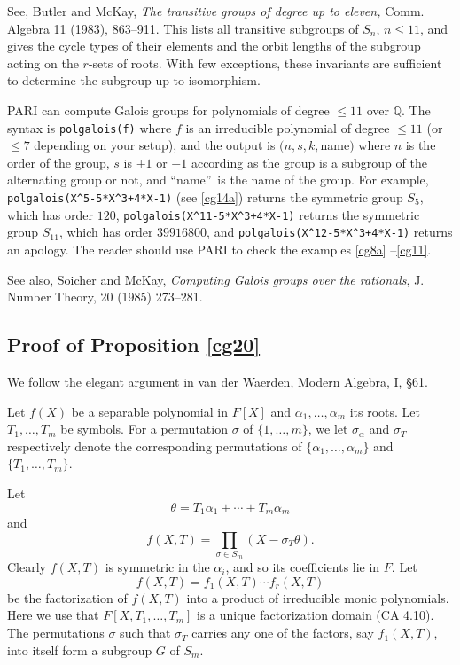 \documentclass[a4paper,11pt,final,openany]{memoir}
\theoremstyle{nonumberplain}
\begin{document}
See, Butler and McKay, \textit{The transitive groups of degree up to
eleven}\emph{,\/} Comm. Algebra 11 (1983), 863--911. This lists all transitive
subgroups of $S_{n}$, $n\leq11$, and gives the cycle types of their elements
and the orbit lengths of the subgroup acting on the $r$-sets of roots. With
few exceptions, these invariants are sufficient to determine the subgroup up
to isomorphism.

PARI%
can compute Galois groups for polynomials of degree $\leq11$ over $\mathbb{Q}%
$. The syntax is \verb|polgalois(f)| where $f$ is an irreducible polynomial of
degree $\leq11$ (or $\leq7$ depending on your setup), and the output is
$(n,s,k,$name$)$ where $n$ is the order of the group, $s$ is $+1$ or $-1$
according as the group is a subgroup of the alternating group or not, and
\textquotedblleft name\textquotedblright\ is the name of the group. For
example, \verb|polgalois(X^5-5*X^3+4*X-1)| (see \ref{cg14a}) returns the
symmetric group $S_{5}$, which has order $120$,
\verb|polgalois(X^11-5*X^3+4*X-1)| returns the symmetric group $S_{11}$, which
has order $39916800$, and \newline\verb|polgalois(X^12-5*X^3+4*X-1)| returns
an apology. The reader should use PARI to check the examples \ref{cg8a}%
--\ref{cg11}.

See also, Soicher and McKay, \textit{Computing Galois groups over the
rationals}, J. Number Theory, 20 (1985) 273--281.

\subsection{Proof of Proposition \ref{cg20}}

We follow the elegant argument in van der Waerden, Modern Algebra, I, \S 61.

Let $f(X)$ be a separable polynomial in $F[X]$ and $\alpha_{1},\ldots
,\alpha_{m}$ its roots. Let $T_{1},\ldots,T_{m}$ be symbols. For a permutation
$\sigma$ of $\{1,\ldots,m\}$, we let $\sigma_{\alpha}$ and $\sigma_{T}$
respectively denote the corresponding permutations of $\{\alpha_{1}%
,\ldots,\alpha_{m}\}$ and $\{T_{1},\ldots,T_{m}\}$.

Let%
\[
\theta=T_{1}\alpha_{1}+\cdots+T_{m}\alpha_{m}%
\]
and%
\[
f(X,T)=\prod_{\sigma\in S_{m}}(X-\sigma_{T}\theta).
\]
Clearly $f(X,T)$ is symmetric in the $\alpha_{i}$, and so its coefficients lie
in $F$. Let%
\begin{equation}
f(X,T)=f_{1}(X,T)\cdots f_{r}(X,T) \label{eq13}%
\end{equation}
be the factorization of $f(X,T)$ into a product of irreducible monic
polynomials. Here we use that $F[X,T_{1},\ldots,T_{m}]$ is a unique
factorization domain (CA 4.10). The permutations $\sigma$ such that
$\sigma_{T}$ carries any one of the factors, say $f_{1}(X,T)$, into itself
form a subgroup $G$ of $S_{m}$.
\end{document}
